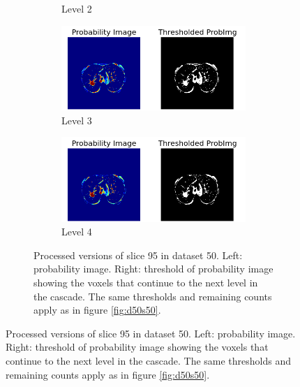 \begin{figure}[p]
\begin{center}
\begin{subfigure}[b]{0.45\linewidth}
\begin{subfigure}[b]{\linewidth}
			\caption{Level 2}
		\end{subfigure}
		\begin{subfigure}[b]{\linewidth}
			\includegraphics[width=\linewidth]{img/cascades/D50L3S95.png}
			\caption{Level 3}
		\end{subfigure}
		\begin{subfigure}[b]{\linewidth}
			\includegraphics[width=\linewidth]{img/cascades/D50L4S95.png}
			\caption{Level 4}
		\end{subfigure}
	  \caption{Processed versions of slice 95 in dataset 50. Left: probability
	  image. Right: threshold of probability image showing the voxels that continue
	  to the next level in the cascade. The same thresholds and remaining counts
	  apply as in figure \ref{fig:d50s50}.}
	  \label{fig:d50s95}
  \end{subfigure}
\end{center}
\end{figure}

